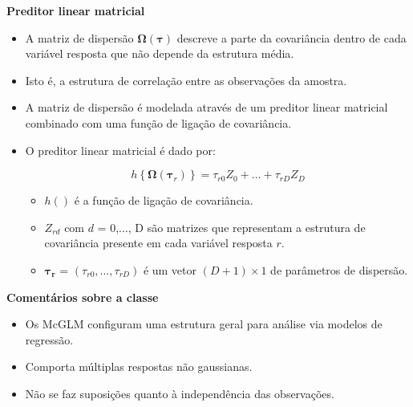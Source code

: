 \documentclass[10pt,
  aspectratio=169,
  serif,
  mathserif,
  professionalfont,
  compress,
  handout,
  ]{beamer}\usepackage[]{graphicx}\usepackage[]{color}
\begin{document}
\begin{frame}[c, allowframebreaks]

\textbf{Preditor linear matricial}

\begin{itemize}
  
  \item A matriz de dispersão $\boldsymbol{\Omega({\tau})}$ descreve a parte da covariância dentro de cada variável resposta que não depende da estrutura média. 
  
  \item Isto é, a estrutura de correlação entre as observações da amostra.
  
  \item A matriz de dispersão é modelada através de um preditor linear matricial combinado com uma função de ligação de covariância.
  
  \item O preditor linear matricial é dado por:

$$
h\left \{ \boldsymbol{\Omega}(\boldsymbol{\tau}_r) \right \} = \tau_{r0}Z_0 + \ldots + \tau_{rD}Z_D
$$
  
  \begin{itemize}
  
  \item $h()$ é a função de ligação de covariância.
  
  \item $Z_{rd}$ com $d$ = 0,$\ldots$, D são matrizes que representam a estrutura de covariância presente em cada variável resposta $r$.
  
  \item $\boldsymbol{\tau_r}$ = $(\tau_{r0}, \ldots, \tau_{rD})$ é um vetor $(D + 1) \times 1$ de parâmetros de dispersão. 
  
\end{itemize}

     
\end{itemize}

\end{frame}


\begin{frame}[c, allowframebreaks]

\textbf{Comentários sobre a classe}

\begin{itemize}
  
  \item Os McGLM configuram uma estrutura geral para análise via modelos de regressão.
  
  \item Comporta múltiplas respostas não gaussianas.
  
  \item Não se faz suposições quanto à independência das observações. 
  
\end{itemize}

\end{frame}
\end{document}
